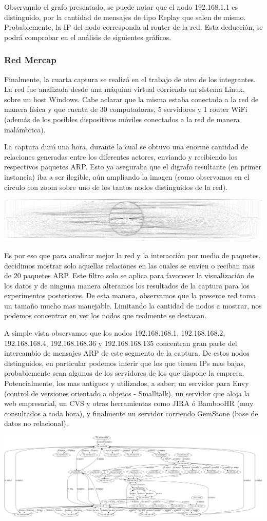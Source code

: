 Observando el grafo presentado, se puede notar que el nodo 192.168.1.1 es distinguido, por la cantidad de mensajes de tipo Replay que salen de mismo. Probablemente, la IP del nodo corresponda al router de la red. Esta  deducción, se podrá comprobar en el análisis de siguientes gráficos.

\subsubsection{Red Mercap}
Finalmente, la cuarta captura se realizó en el trabajo de otro de los integrantes. La red fue analizada desde una máquina virtual corriendo un sistema Linux, sobre un host Windows. Cabe aclarar que la misma estaba conectada a la red de manera física y que cuenta de 30 computadoras, 5 servidores y 1 router WiFi (además de los posibles dispositivos móviles conectados a la red de manera inalámbrica).

La captura duró una hora, durante la cual se obtuvo una enorme cantidad de relaciones generadas entre los diferentes actores, enviando y recibiendo los respectivos paquetes ARP. Esto ya aseguraba que el digrafo resultante (en primer instancia) iba a ser ilegible, aún ampliando la imagen (como observamos en el círculo con zoom sobre uno de los tantos nodos distinguidos de la red). 

\centerline{\includegraphics[angle=0,scale=0.3]{./graficos/grafos-arp/grafo_laburo_eze1.png}}

Es por eso que para analizar mejor la red y la interacción por medio de paquetes, decidimos mostrar solo aquellas relaciones en las cuales se envíen o reciban mas de 20 paquetes ARP. Este filtro solo se aplica para favorecer la visualización de los datos y de ninguna manera alteramos los resultados de la captura para los experimentos posteriores. De esta manera, observamos que la presente red toma un tamaño mucho mas manejable. Limitando la cantidad de nodos a mostrar, nos podemos concentrar en ver los nodos que realmente se destacan.

A simple vista observamos que los nodos 192.168.168.1, 192.168.168.2, 192.168.168.4, 192.168.168.36 y 192.168.168.135 concentran gran parte del intercambio de mensajes ARP de este segmento de la captura. De estos nodos distinguidos, en particular podemos inferir que los que tienen IPs mas bajas, probablemente sean algunos de los servidores de los que dispone la empresa. Potencialmente, los mas antiguos y utilizados, a saber; un servidor para Envy (control de versiones orientado a objetos - Smalltalk), un servidor que aloja la web empresarial, un CVS y otras herramientas como JIRA ó BambooHR (muy consultados a toda hora), y finalmente un servidor corriendo GemStone (base de datos no relacional).

\centerline{\includegraphics[angle=90,scale=0.2]{./graficos/grafos-arp/grafo_laburo_eze2.png}}
